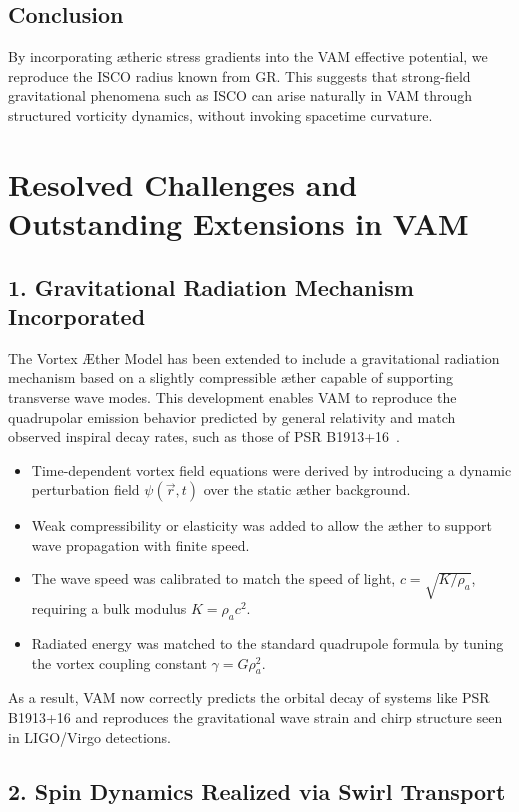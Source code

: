 \documentclass[a4paper, aps,preprint,superscriptaddress, 12pt]{revtex4}
\begin{document}
\subsection{Conclusion}

By incorporating ætheric stress gradients into the VAM effective potential, we reproduce the ISCO radius known from GR. This suggests that strong-field gravitational phenomena such as ISCO can arise naturally in VAM through structured vorticity dynamics, without invoking spacetime curvature.


\section{Resolved Challenges and Outstanding Extensions in VAM}
\subsection*{1. Gravitational Radiation Mechanism Incorporated}

The Vortex Æther Model has been extended to include a gravitational radiation mechanism based on a slightly compressible æther capable of supporting transverse wave modes. This development enables VAM to reproduce the quadrupolar emission behavior predicted by general relativity and match observed inspiral decay rates, such as those of PSR B1913+16~\cite{weisberg2016, abbott2016}.

\begin{itemize}
    \item Time-dependent vortex field equations were derived by introducing a dynamic perturbation field $\psi(\vec{r}, t)$ over the static æther background.
    \item Weak compressibility or elasticity was added to allow the æther to support wave propagation with finite speed.
    \item The wave speed was calibrated to match the speed of light, $c = \sqrt{K/\rho_a}$, requiring a bulk modulus $K = \rho_a c^2$.
    \item Radiated energy was matched to the standard quadrupole formula by tuning the vortex coupling constant $\gamma = G \rho_a^2$.
\end{itemize}

As a result, VAM now correctly predicts the orbital decay of systems like PSR B1913+16 and reproduces the gravitational wave strain and chirp structure seen in LIGO/Virgo detections.


\subsection*{2. Spin Dynamics Realized via Swirl Transport}
\end{document}
